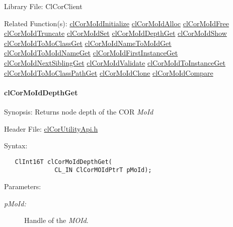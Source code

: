 \begin{Desc}
\item[Library File:]Cl\-Cor\-Client\end{Desc}
\begin{Desc}
\item[Related Function(s):]\hyperlink{group__group13}{cl\-Cor\-Mo\-Id\-Initialize} \hyperlink{group__group13}{cl\-Cor\-Mo\-Id\-Alloc} \hyperlink{group__group13}{cl\-Cor\-Mo\-Id\-Free} \hyperlink{group__group13}{cl\-Cor\-Mo\-Id\-Truncate} \hyperlink{group__group13}{cl\-Cor\-Mo\-Id\-Set} \hyperlink{group__group13}{cl\-Cor\-Mo\-Id\-Depth\-Get} \hyperlink{group__group13}{cl\-Cor\-Mo\-Id\-Show} \hyperlink{group__group13}{cl\-Cor\-Mo\-Id\-To\-Mo\-Class\-Get} \hyperlink{group__group13}{cl\-Cor\-Mo\-Id\-Name\-To\-Mo\-Id\-Get} \hyperlink{group__group13}{cl\-Cor\-Mo\-Id\-To\-Mo\-Id\-Name\-Get} \hyperlink{group__group13}{cl\-Cor\-Mo\-Id\-First\-Instance\-Get} \hyperlink{group__group13}{cl\-Cor\-Mo\-Id\-Next\-Sibling\-Get} \hyperlink{group__group13}{cl\-Cor\-Mo\-Id\-Validate} \hyperlink{group__group13}{cl\-Cor\-Mo\-Id\-To\-Instance\-Get} \hyperlink{group__group13}{cl\-Cor\-Mo\-Id\-To\-Mo\-Class\-Path\-Get} \hyperlink{group__group13}{cl\-Cor\-Mo\-Id\-Clone} \hyperlink{group__group13}{cl\-Cor\-Mo\-Id\-Compare} \end{Desc}
\hypertarget{pagecor235}{}\paragraph{cl\-Cor\-Mo\-Id\-Depth\-Get}\label{pagecor235}
\begin{Desc}
\item[Synopsis:]Returns node depth of the COR {\em Mo\-Id\/} \end{Desc}
\begin{Desc}
\item[Header File:]\hyperlink{cl_cor_utility_api_8h}{cl\-Cor\-Utility\-Api.h}\end{Desc}
\begin{Desc}
\item[Syntax:]

\footnotesize\begin{verbatim}   ClInt16T clCorMoIdDepthGet(
              CL_IN ClCorMOIdPtrT pMoId);
\end{verbatim}
\normalsize
\end{Desc}
\begin{Desc}
\item[Parameters:]
\begin{description}
\item[{\em p\-Mo\-Id:}]Handle of the {\em MOId\/}.\end{description}
\end{Desc}
